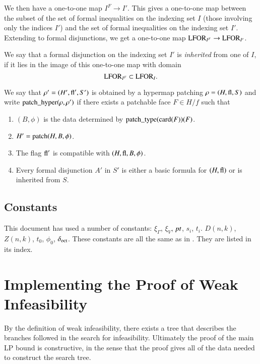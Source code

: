 We then have a one-to-one map $I^F \to I'$.  This gives a
one-to-one map between the subset of the set of formal
inequalities on the indexing set $I$ (those involving only the
indices $I'$) and the set of formal inequalities on the indexing
set $I'$. Extending to formal disjunctions, we get a one-to-one
map ${\operatorname{LFOR}}_{I^F}\to {\operatorname{LFOR}}_{I'}$.

\begin{definition}  We say that a formal disjunction on the
indexing set $I'$ is {\it inherited} from one of $I$, if it lies
in the image of this one-to-one map with domain
    $${\operatorname{LFOR}}_{I^F}\subset {\operatorname{LFOR}}_I.$$
\end{definition}



\begin{definition}
We say that $\rho'=(H',{\operatorname{fl}}',S')$ is obtained by a hypermap
patching $\rho =(H,{\operatorname{fl}},S)$  and write
${\operatorname{patch\_hyper}}(\rho,\rho')$ if there exists a patchable face
$F\in H/f$ such that
    \begin{enumerate}
    \item $(B,\phi)$ is the data determined by ${\operatorname{patch\_type}}({\operatorname{card}}(F))(F)$.
    \item $H' = {\operatorname{patch}}(H,B,\phi)$.
    \item The flag ${\operatorname{fl}}'$ is compatible with $(H,{\operatorname{fl}},B,\phi)$.
    \item Every formal disjunction $A'$ in $S'$ is either a basic
    formula for $(H,{\operatorname{fl}})$ or is inherited from $S$.
    \end{enumerate}
\end{definition}

\subsection{Constants}

This document has used a number of constants: $\xi_\Gamma$,
$\xi_V$, $\hbox{\it pt}$, $s_i$, $t_i$. $D(n,k)$, $Z(n,k)$, $t_0$, $\phi_0$,
$\delta_{\operatorname{oct}}$.
%
These constants are all the same as in \cite{DCG}.  They are
listed in its index.


\section{Implementing the Proof of Weak Infeasibility}

By the definition of weak infeasibility, there exists a tree that
describes the branches followed in the search for infeasibility.
Ultimately the proof of the main LP bound is constructive, in the
sense that the proof gives all of the data needed to construct the
search tree.

